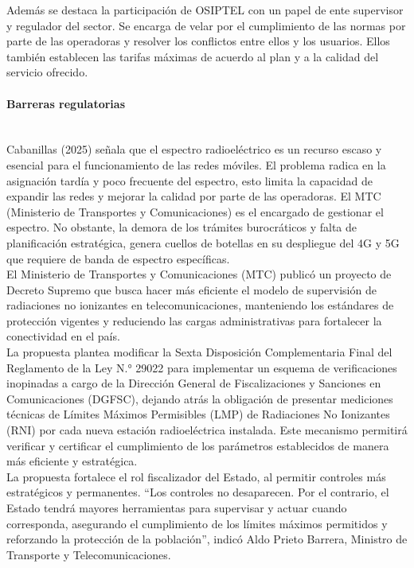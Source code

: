 \documentclass[12pt,a4paper]{article}
\begin{document}
	Además se destaca la participación de OSIPTEL con un papel de ente  supervisor y regulador del sector. Se encarga de velar por el cumplimiento de las normas por parte de las operadoras y resolver los conflictos entre ellos y los usuarios. Ellos también establecen las tarifas máximas de acuerdo al plan y a la calidad del servicio ofrecido.
	
	\paragraph*{Barreras regulatorias} \mbox{}\\
	
	Cabanillas (2025) señala que el espectro radioeléctrico es un recurso escaso y esencial para el funcionamiento de las redes móviles. El problema radica en la asignación tardía y poco frecuente del espectro, esto limita la capacidad de expandir las redes y mejorar la calidad por parte de las operadoras. El MTC (Ministerio de Transportes y Comunicaciones) es el encargado de gestionar el espectro. No obstante, la demora de los trámites burocráticos y falta de planificación estratégica, genera cuellos de botellas en su despliegue del 4G y 5G que requiere de banda de espectro específicas.\\
	
	El Ministerio de Transportes y Comunicaciones (MTC) publicó un proyecto de Decreto Supremo que busca hacer más eficiente el modelo de supervisión de radiaciones no ionizantes en telecomunicaciones, manteniendo los estándares de protección vigentes y reduciendo las cargas administrativas para fortalecer la conectividad en el país.\\
	
	La propuesta plantea modificar la Sexta Disposición Complementaria Final del Reglamento de la Ley N.° 29022 para implementar un esquema de verificaciones inopinadas a cargo de la Dirección General de Fiscalizaciones y Sanciones en Comunicaciones (DGFSC), dejando atrás la obligación de presentar mediciones técnicas de Límites Máximos Permisibles (LMP) de Radiaciones No Ionizantes (RNI) por cada nueva estación radioeléctrica instalada. Este mecanismo permitirá verificar y certificar el cumplimiento de los parámetros establecidos de manera más eficiente y estratégica.\\
	
	La propuesta fortalece el rol fiscalizador del Estado, al permitir controles más estratégicos y permanentes. “Los controles no desaparecen. Por el contrario, el Estado tendrá mayores herramientas para supervisar y actuar cuando corresponda, asegurando el cumplimiento de los límites máximos permitidos y reforzando la protección de la población”, indicó Aldo Prieto Barrera, Ministro de Transporte y Telecomunicaciones.
\end{document}
